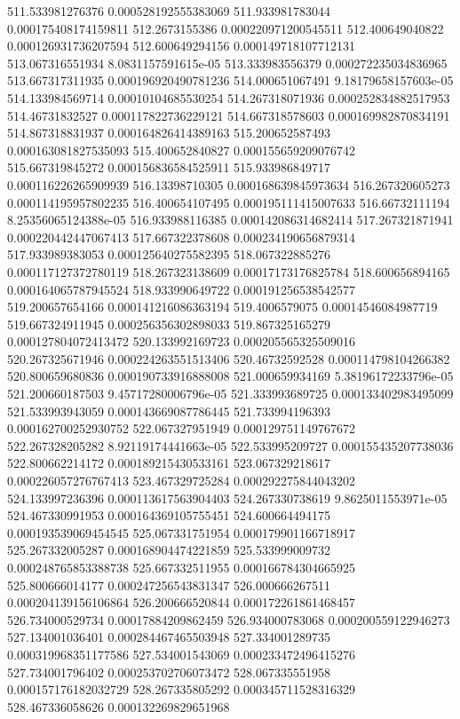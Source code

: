 {511.533981276376 0.000528192555383069
511.933981783044 0.000175408174159811
512.2673155386 0.000220971200545511
512.400649040822 0.000126931736207594
512.600649294156 0.000149718107712131
513.067316551934 8.0831157591615e-05
513.333983556379 0.000272235034836965
513.667317311935 0.000196920490781236
514.000651067491 9.18179658157603e-05
514.133984569714 0.00010104685530254
514.267318071936 0.000252834882517953
514.46731832527 0.000117822736229121
514.667318578603 0.000169982870834191
514.867318831937 0.000164826414389163
515.200652587493 0.000163081827535093
515.400652840827 0.000155659209076742
515.667319845272 0.000156836584525911
515.933986849717 0.000116226265909939
516.13398710305 0.000168639845973634
516.267320605273 0.000114195957802235
516.400654107495 0.000195111415007633
516.66732111194 8.25356065124388e-05
516.933988116385 0.000142086314682414
517.267321871941 0.000220442447067413
517.667322378608 0.000234190656879314
517.933989383053 0.000125640275582395
518.067322885276 0.000117127372780119
518.267323138609 0.00017173176825784
518.600656894165 0.000164065787945524
518.933990649722 0.000191256538542577
519.200657654166 0.000141216086363194
519.4006579075 0.00014546084987719
519.667324911945 0.000256356302898033
519.867325165279 0.000127804072413472
520.133992169723 0.000205565325509016
520.267325671946 0.000224263551513406
520.46732592528 0.000114798104266382
520.800659680836 0.000190733916888008
521.000659934169 5.38196172233796e-05
521.200660187503 9.45717280006796e-05
521.333993689725 0.000133402983495099
521.533993943059 0.000143669087786445
521.733994196393 0.000162700252930752
522.067327951949 0.000129751149767672
522.267328205282 8.92119174441663e-05
522.533995209727 0.000155435207738036
522.800662214172 0.000189215430533161
523.067329218617 0.000226057276767413
523.467329725284 0.000292275844043202
524.133997236396 0.000113617563904403
524.267330738619 9.8625011553971e-05
524.467330991953 0.000164369105755451
524.600664494175 0.000193539069454545
525.067331751954 0.000179901166718917
525.267332005287 0.000168904474221859
525.533999009732 0.000248765853388738
525.667332511955 0.000166784304665925
525.800666014177 0.000247256543831347
526.000666267511 0.000204139156106864
526.200666520844 0.000172261861468457
526.734000529734 0.00017884209862459
526.934000783068 0.000200559122946273
527.134001036401 0.000284467465503948
527.334001289735 0.000319968351177586
527.534001543069 0.000233472496415276
527.734001796402 0.000253702706073472
528.067335551958 0.000157176182032729
528.267335805292 0.000345711528316329
528.467336058626 0.000132269829651968
}
